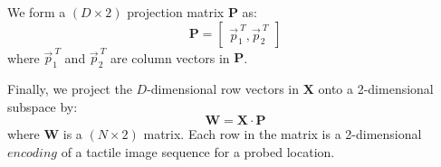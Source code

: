 We form a $(D\times 2)$ projection matrix $\mathbf{P}$ as:
\begin{equation}
\mathbf{P}=\begin{bmatrix}\vec{p}_1^{\ T}, \vec{p}_2^{\ T}\end{bmatrix}	
\end{equation}
where $\vec{p}_1^{\ T}$ and $\vec{p}_2^{\ T}$ are column vectors in $\mathbf{P}$. 

Finally, we project the $D$-dimensional row vectors in $\mathbf{X}$ onto a 2-dimensional subspace by:
\begin{equation}
\mathbf{W}=\mathbf{X}\cdot \mathbf{P}
\end{equation}
where $\mathbf{W}$ is a $(N\times 2)$ matrix. Each row in the matrix is a 2-dimensional $encoding$ of a 
tactile image sequence for a probed location.


